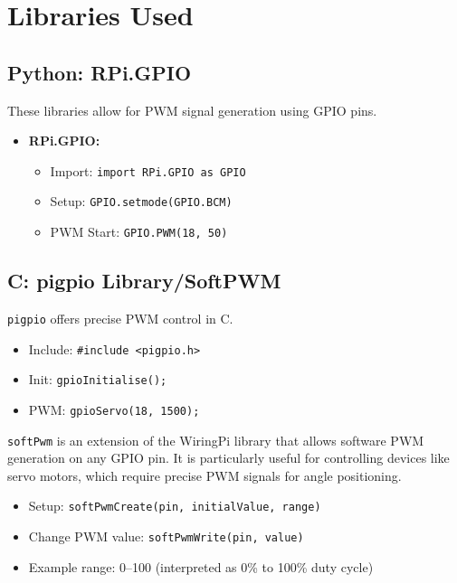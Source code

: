 \documentclass{article}
\begin{document}
	\section{Libraries Used}
	\subsection*{Python: RPi.GPIO}
	These libraries allow for PWM signal generation using GPIO pins.
	\begin{itemize}
		\item \textbf{RPi.GPIO:}
		\begin{itemize}
			\item Import: \texttt{import RPi.GPIO as GPIO}
			\item Setup: \texttt{GPIO.setmode(GPIO.BCM)}
			\item PWM Start: \texttt{GPIO.PWM(18, 50)}
		\end{itemize}
		
	\end{itemize}
	
	\subsection*{C: pigpio Library/SoftPWM}
	\texttt{pigpio} offers precise PWM control in C.
	\begin{itemize}
		\item Include: \texttt{\#include <pigpio.h>}
		\item Init: \texttt{gpioInitialise();}
		\item PWM: \texttt{gpioServo(18, 1500);}
	\end{itemize}
	\texttt{softPwm} is an extension of the WiringPi library that allows software PWM generation on any GPIO pin. It is particularly useful for controlling devices like servo motors, which require precise PWM signals for angle positioning.
	
	\begin{itemize}
		\item Setup: \texttt{softPwmCreate(pin, initialValue, range)}
		\item Change PWM value: \texttt{softPwmWrite(pin, value)}
		\item Example range: 0–100 (interpreted as 0\% to 100\% duty cycle)
	\end{itemize}
\end{document}
